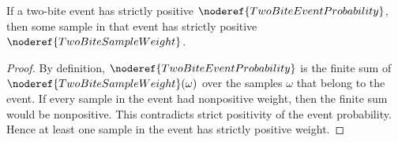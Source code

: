 \begin{helper}
If a two-bite event has strictly positive
\(\noderef{TwoBiteEventProbability}\), then some sample in that event has
strictly positive \(\noderef{TwoBiteSampleWeight}\).
\end{helper}
\begin{proof}
By definition, \(\noderef{TwoBiteEventProbability}\) is the finite sum of
\(\noderef{TwoBiteSampleWeight}(\omega)\) over the samples \(\omega\) that
belong to the event.  If every sample in the event had nonpositive weight, then
the finite sum would be nonpositive.  This contradicts strict positivity of the
event probability.  Hence at least one sample in the event has strictly
positive weight.
\end{proof}
